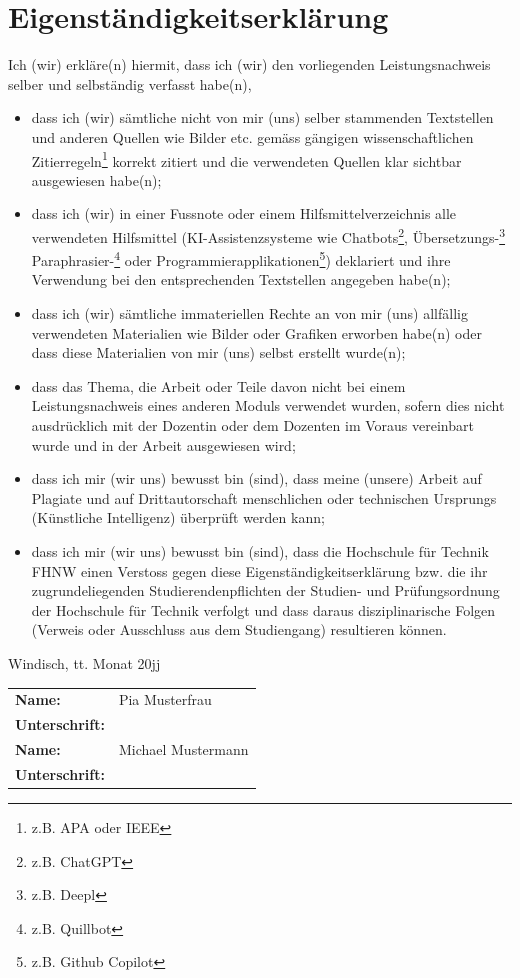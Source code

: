 \section*{Eigenständigkeitserklärung}


Ich (wir) erkläre(n) hiermit, dass ich (wir) den vorliegenden Leistungsnachweis selber und selbständig verfasst habe(n),
\begin{itemize} 
\item dass ich (wir) sämtliche nicht von mir (uns) selber stammenden Textstellen und anderen Quellen wie Bilder etc. gemäss gängigen wissenschaftlichen Zitierregeln\footnote{z.B. APA oder IEEE} korrekt zitiert und die verwendeten Quellen klar sichtbar ausgewiesen habe(n); 
\item dass ich (wir) in einer Fussnote oder einem Hilfsmittelverzeichnis alle verwendeten Hilfsmittel (KI-Assistenzsysteme wie Chatbots\footnote{z.B. ChatGPT}, Übersetzungs-\footnote{z.B. Deepl} Paraphrasier-\footnote{z.B. Quillbot} oder Programmierapplikationen\footnote{z.B. Github Copilot}) deklariert und ihre Verwendung bei den entsprechenden Textstellen angegeben habe(n);
\item dass ich (wir) sämtliche immateriellen Rechte an von mir (uns) allfällig verwendeten Materialien wie Bilder oder Grafiken erworben habe(n) oder dass diese Materialien von mir (uns) selbst erstellt wurde(n);
\item dass das Thema, die Arbeit oder Teile davon nicht bei einem Leistungsnachweis eines anderen Moduls verwendet wurden, sofern dies nicht ausdrücklich mit der Dozentin oder dem Dozenten im Voraus vereinbart wurde und in der Arbeit ausgewiesen wird; 
\item dass ich mir (wir uns) bewusst bin (sind), dass meine (unsere) Arbeit auf Plagiate und auf Drittautorschaft menschlichen oder technischen Ursprungs (Künstliche Intelligenz) überprüft werden kann;
\item dass ich mir (wir uns) bewusst bin (sind), dass die Hochschule für Technik FHNW einen Verstoss gegen diese Eigenständigkeitserklärung bzw. die ihr zugrundeliegenden Studierendenpflichten der Studien- und Prüfungsordnung der Hochschule für Technik verfolgt und dass daraus disziplinarische Folgen (Verweis oder Ausschluss aus dem Studiengang) resultieren können.
\end{itemize}

\vspace*{4ex}

Windisch, tt. Monat 20jj

\vspace*{4ex}

{\renewcommand{\arraystretch}{2}
\begin{tabular}{@{}>{\bf}ll}
Name: & Pia Musterfrau\\
Unterschrift: & \\[6ex]
Name: & Michael Mustermann\\
Unterschrift: & \\
\end{tabular}}